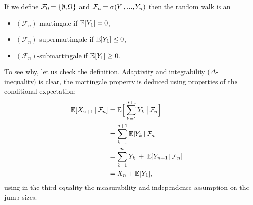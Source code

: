 \begin{example}
		
			If we define $\mathcal{F}_0 = \lbrace \emptyset,\Omega \rbrace$ and $\mathcal{F}_n = \sigma(Y_1,...,Y_n)$ then the random walk is an
			\begin{itemize}
				\item
					$(\mathcal F_n)$-martingale if $\mathbb{E}[Y_1]=0$,
				\item
					$(\mathcal F_n)$-supermartingale if $\mathbb{E}[Y_1] \leq 0$,
				\item
					$(\mathcal F_n)$-submartingale if $\mathbb{E}[Y_1] \geq 0$.
			\end{itemize}
			To see why, let us check the definition. Adaptivity and integrability ($\Delta$-inequality) is clear, the martingale property is deduced using properties of the conditional expectation:
			\begin{align*}
				\E[X_{n+1}\,|\,\cF_n] &= \E \Big[ \sum\limits_{k=1}^{n+1}Y_k \,\big|\,\cF_n\Big]\\
											&= \sum\limits_{k=1}^{n+1} \E[Y_k\,|\,\cF_n] \\
											&= \sum\limits_{k=1}^{n}Y_k \: + \: \E[Y_{n+1}\,|\,\cF_n]\\%
											&= X_n + \E[Y_1],
			\end{align*}
			using in the third equality the measurability and independence assumption on the jump sizes.
\end{example}
